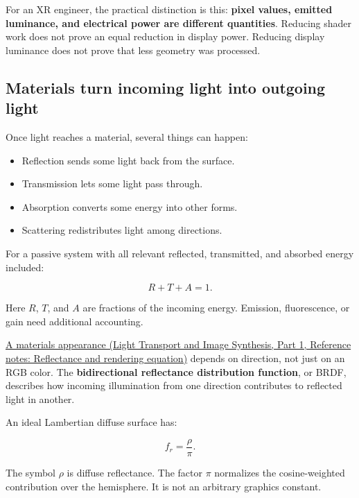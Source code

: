 For an XR engineer, the practical distinction is this: \textbf{pixel values, emitted luminance, and electrical power are different quantities}. Reducing shader work does not prove an equal reduction in display power. Reducing display luminance does not prove that less geometry was processed.

\subsection{Materials turn incoming light into outgoing light}\label{04-visual-computing-ii-ch043-materials-turn-incoming-light-into-outgoing-light}

\hypertarget{04-visual-computing-ii-ch043-materials-turn-incoming-light-into-outgoing-light}{}

Once light reaches a material, several things can happen:

\begin{itemize}
\tightlist
\item
  Reflection sends some light back from the surface.
\item
  Transmission lets some light pass through.
\item
  Absorption converts some energy into other forms.
\item
  Scattering redistributes light among directions.
\end{itemize}

For a passive system with all relevant reflected, transmitted, and absorbed energy included:

\[
R+T+A=1.
\]

Here \(R\), \(T\), and \(A\) are fractions of the incoming energy. Emission, fluorescence, or gain need additional accounting.

\href{../04-Light-Transport-and-Image-Synthesis-P01/main.pdf\#nameddest=appendix-96da0b153b77}{A material\textquotesingle s appearance (Light Transport and Image Synthesis, Part 1, Reference notes: Reflectance and rendering equation)} depends on direction, not just on an RGB color. The \textbf{bidirectional reflectance distribution function}, or BRDF, describes how incoming illumination from one direction contributes to reflected light in another.

An ideal Lambertian diffuse surface has:

\[
f_r=\frac{\rho}{\pi}.
\]

The symbol \(\rho\) is diffuse reflectance. The factor \(\pi\) normalizes the cosine-weighted contribution over the hemisphere. It is not an arbitrary graphics constant.

